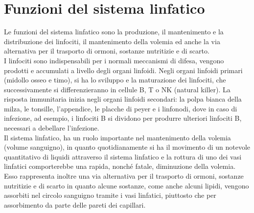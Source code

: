 \section{Funzioni del sistema linfatico}
Le funzioni del sistema linfatico sono la produzione, il mantenimento e la distribuzione dei linfociti, 
il mantenimento della volemia ed anche la via alternativa per il trasporto di ormoni,
sostanze nutritizie e di scarto\cite{BOOK1}.\\
I linfociti sono indispensabili per i normali meccanismi di difesa, vengono prodotti e accumulati a livello 
degli organi linfoidi. Negli organi linfoidi primari (midollo osseo e timo), si ha lo sviluppo e 
la maturazione dei linfociti, che successivamente si differenzieranno in cellule B, T o NK (natural killer)\cite{BOOK1}.
La risposta immunitaria inizia negli organi linfoidi secondari: la polpa bianca della milza, le tonsille, 
l’appendice, le placche di peyer e i linfonodi, dove in caso di infezione, ad esempio,
i linfociti B si dividono per produrre ulteriori linfociti B, necessari a debellare l’infezione.\\
Il sistema linfatico, ha un ruolo importante nel mantenimento della volemia (volume sanguigno), in quanto 
quotidianamente si ha il movimento di un notevole quantitativo di liquidi attraverso il sistema linfatico e 
la rottura di uno dei vasi linfatici comporterebbe una rapida, nonché fatale, diminuzione della volemia\cite{BOOK1}.\\
Esso rappresenta inoltre una via alternativa per il trasporto di ormoni, sostanze nutritizie e 
di scarto in quanto alcune sostanze, come anche alcuni lipidi, vengono assorbiti nel circolo sanguigno tramite 
i vasi linfatici, piuttosto che per assorbimento da parte delle pareti dei capillari\cite{BOOK1}.

